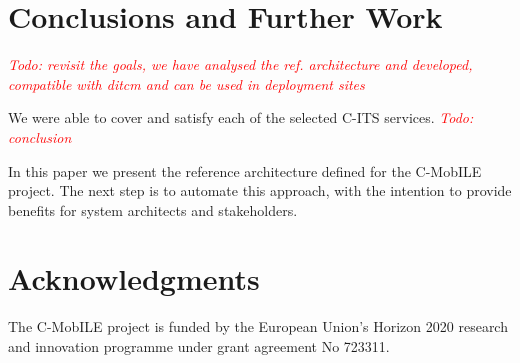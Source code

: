 \documentclass[conference]{IEEEtran}
\newcommand{\todo}[1]{\textcolor{red}{\emph{Todo: #1}}}
\begin{document}
\section{Conclusions and Further Work}

\todo{revisit the goals, we have analysed the ref. architecture and developed, compatible with ditcm and can be used in deployment sites}

We were able to cover and satisfy each of the selected C-ITS services.
\todo{conclusion}

In this paper we present the reference architecture defined for the C-MobILE project.
The next step is to automate this approach, with the intention to provide benefits for system architects and stakeholders.


\section*{Acknowledgments}

The C-MobILE project is funded by the European Union's Horizon 2020 research and innovation programme under grant agreement No 723311.
\end{document}
